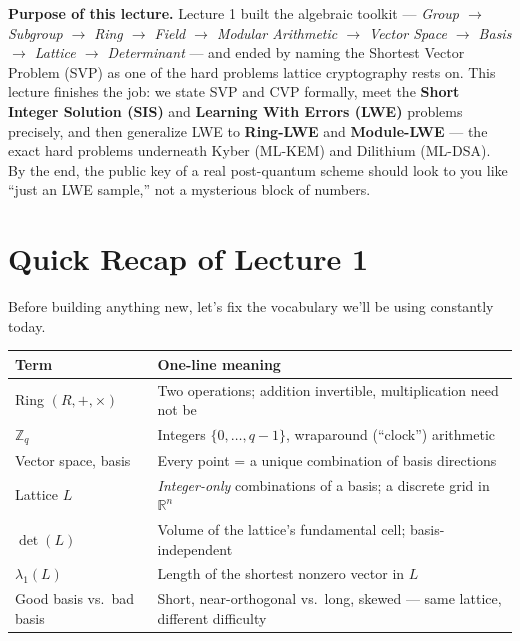 \begin{notebox}
\small\textbf{Purpose of this lecture.} Lecture 1 built the algebraic toolkit --- \emph{Group $\to$ Subgroup $\to$ Ring $\to$ Field $\to$ Modular Arithmetic $\to$ Vector Space $\to$ Basis $\to$ Lattice $\to$ Determinant} --- and ended by naming the Shortest Vector Problem (SVP) as one of the hard problems lattice cryptography rests on. This lecture finishes the job: we state SVP and CVP formally, meet the \textbf{Short Integer Solution (SIS)} and \textbf{Learning With Errors (LWE)} problems precisely, and then generalize LWE to \textbf{Ring-LWE} and \textbf{Module-LWE} --- the exact hard problems underneath Kyber (ML-KEM) and Dilithium (ML-DSA). By the end, the public key of a real post-quantum scheme should look to you like ``just an LWE sample,'' not a mysterious block of numbers.
\end{notebox}

\section{Quick Recap of Lecture 1}
\label{sec:L2:quick-recap-of-lecture-1}

Before building anything new, let's fix the vocabulary we'll be using constantly today.

\begin{center}
\renewcommand{\arraystretch}{1.25}
\begin{tabular}{|l|l|}
\hline
\textbf{Term} & \textbf{One-line meaning} \\
\hline
Ring $(R,+,\times)$ & Two operations; addition invertible, multiplication need not be \\
$\mathbb{Z}_q$ & Integers $\{0,\ldots,q-1\}$, wraparound (``clock'') arithmetic \\
Vector space, basis & Every point = a unique combination of basis directions \\
Lattice $L$ & \emph{Integer-only} combinations of a basis; a discrete grid in $\mathbb{R}^n$ \\
$\det(L)$ & Volume of the lattice's fundamental cell; basis-independent \\
$\lambda_1(L)$ & Length of the shortest nonzero vector in $L$ \\
Good basis vs.\ bad basis & Short, near-orthogonal vs.\ long, skewed --- same lattice, different difficulty \\
\hline
\end{tabular}
\end{center}

